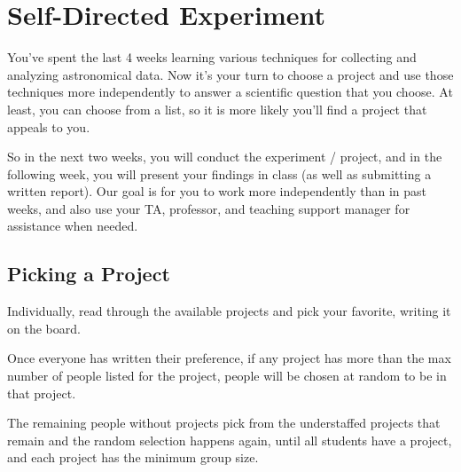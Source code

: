 \chapter{Self-Directed Experiment}


You've spent the last 4 weeks learning various techniques for collecting and analyzing astronomical data. Now it's your turn to choose a project and use those techniques more independently to answer a scientific question that you choose. At least, you can choose from a list, so it is more likely you'll find a project that appeals to you.

So in the next two weeks, you will conduct the experiment / project, and in the following week, you will present your findings in class (as well as submitting a written report). Our goal is for you to work more independently than in past weeks, and also use your TA, professor, and teaching support manager for assistance when needed.

\section{Picking a Project}

\begin{steps}
	\item Individually, read through the available projects and pick your favorite, writing it on the board.
	
	\item Once everyone has written their preference, if any project has more than the max number of people listed for the project, people will be chosen at random to be in that project.
	
	\item The remaining people without projects pick from the understaffed projects that remain and the random selection happens again, until all students have a project, and each project has the minimum group size.
\end{steps}


